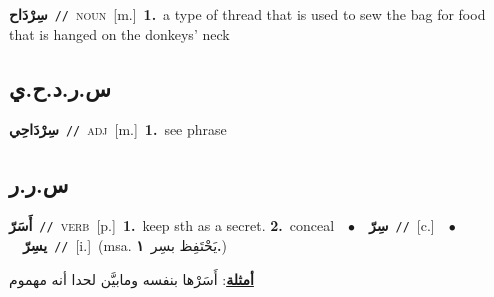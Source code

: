 \documentclass[10pt,a4paper,twoside]{article} %
\begin{document}
\begin{multicols}{2}
{\setlength\topsep{0pt}\textbf{\foreignlanguage{arabic}{سِرْدَاح}}\ {\color{gray}\texttt{//}\color{black}}\ \textsc{noun}\ [m.]\ \textbf{1.}~a type of thread that is used to sew the bag for food that is hanged on the donkeys' neck\ } \vspace{2mm}

\vspace{-3mm}
\subsection*{\color{blue}\foreignlanguage{arabic}{س.ر.د.ح.ي}\color{blue}{ (ntws)}} 

{\setlength\topsep{0pt}\textbf{\foreignlanguage{arabic}{سِرْدَاحِي}}\ {\color{gray}\texttt{//}\color{black}}\ \textsc{adj}\ [m.]\ \textbf{1.}~see phrase\ } \vspace{2mm}

\vspace{-3mm}
\subsection*{\color{blue}\foreignlanguage{arabic}{س.ر.ر}\color{blue}{}} 

{\setlength\topsep{0pt}\textbf{\foreignlanguage{arabic}{أَسَرّ}}\ {\color{gray}\texttt{//}\color{black}}\ \textsc{verb}\ [p.]\ \textbf{1.}~keep sth as a secret.  \textbf{2.}~conceal\ \ $\bullet$\ \ \setlength\topsep{0pt}\textbf{\foreignlanguage{arabic}{سِرّ}}\ {\color{gray}\texttt{//}\color{black}}\ [c.]\ \ $\bullet$\ \ \setlength\topsep{0pt}\textbf{\foreignlanguage{arabic}{يسِرّ}}\ {\color{gray}\texttt{//}\color{black}}\ [i.]\ \color{gray}(msa. \foreignlanguage{arabic}{يَحْتَفِظ بسِر}~\foreignlanguage{arabic}{\textbf{١.}})\color{black}\  \begin{flushright}\color{gray}\foreignlanguage{arabic}{\textbf{\underline{\foreignlanguage{arabic}{أمثلة}}}: أَسَرْها بنفسه ومابيَّن لحدا أنه مهموم}\end{flushright}\color{black}} \vspace{2mm}


\end{multicols}
\end{document}
